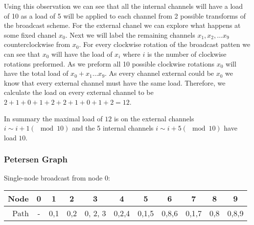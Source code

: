 Using this observation we can see that all the internal channels will have a load of 10 as a load of 5 will be applied to each channel from 2 possible transforms of the broadcast scheme.
For the external chanel we can explore what happens at some fixed chanel $x_0$.
Next we will label the remaining channels $x_1, x_2, \ldots x_9$ counterclockwise from $x_0$.
For every clockwise rotation of the broadcast patten we can see that $x_0$ will have the load of $x_i$ where $i$ is the number of clockwise rotations preformed.
As we preform all 10 possible clockwise rotations $x_0$ will have the total load of $x_0 + x_1 \ldots x_9$.
As every channel external could be $x_0$ we know that every external channel must have the same load.
Therefore, we calculate the load on every external channel to be $2+1+0+1+2+2+1+0+1+2=12$.

In summary the maximal load of $12$ is on the external channels $i\sim i+1 (\mod 10)$ and the 5 internal channels $i\sim i+5 (\mod 10)$ have load $10$.

\subsubsection*{Petersen Graph}

Single-node broadcast from node 0:
\begin{center}
\begin{tabular}{r|cccccccccc}
 Node  &0& 1 & 2 & 3 & 4 & 5 & 6 & 7 & 8 & 9\\
 \hline
 Path  & - & 0,1 & 0,2 & 0, 2, 3 & 0,2,4 & 0,1,5 & 0,8,6 & 0,1,7 & 0,8 & 0,8,9 \\
\end{tabular}
\end{center}

